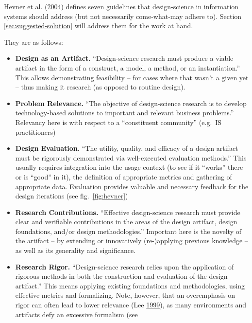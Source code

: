 \documentclass[a4paper,,tablecaptionabove]{scrbook}
\providecommand{\tightlist}{%
  \setlength{\itemsep}{0pt}\setlength{\parskip}{0pt}}
\begin{document}
Hevner et al.
(\protect\hyperlink{ref-HevnerDesignScienceInformation2004}{2004})
defines seven guidelines that design-science in information systems
should address (but not necessarily come-what-may adhere to). Section
\ref{sec:suggested-solution} will address them for the work at hand.

They are as follows:

\begin{itemize}
\tightlist
\item
  \textbf{Design as an Artifact.} \enquote{Design-science research must
  produce a viable artifact in the form of a construct, a model, a
  method, or an instantiation.} This allows demonstrating feasibility --
  for cases where that wasn't a given yet -- thus making it research (as
  opposed to routine design). 
\item
  \textbf{Problem Relevance.} \enquote{The objective of design-science
  research is to develop technology-based solutions to important and
  relevant business problems.} Relevancy here is with respect to a
  \enquote{constituent community} (e.g.~IS practitioners)
\item
  \textbf{Design Evaluation.} \enquote{The utility, quality, and
  efficacy of a design artifact must be rigorously demonstrated via
  well-executed evaluation methods.} This usually requires integration
  into the usage context (to see if it \enquote{works} there or is
  \enquote{good} in it), the definition of appropriate metrics and
  gathering of appropriate data. Evaluation provides valuable and
  necessary feedback for the design iterations (see
  fig.~\ref{fig:hevner})
\item
  \textbf{Research Contributions.} \enquote{Effective design-science
  research must provide clear and verifiable contributions in the areas
  of the design artifact, design foundations, and/or design
  methodologies.} Important here is the novelty of the artifact -- by
  extending or innovatively (re-)applying previous knowledge -- as well
  as its generality and significance.
\item
  \textbf{Research Rigor.} \enquote{Design-science research relies upon
  the application of rigorous methods in both the construction and
  evaluation of the design artifact.} This means applying existing
  foundations and methodologies, using effective metrics and
  formalizing. Note, however, that an overemphasis on rigor can often
  lead to lower relevance (Lee
  \protect\hyperlink{ref-LeeInauguralEditorComments1999}{1999}), as many
  environments and artifacts defy an excessive formalism (see

\end{itemize}
\end{document}
